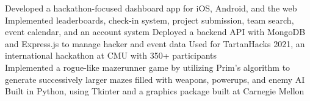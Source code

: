 \documentclass[]{paws}
\begin{document}
{    {Developed a hackathon-focused dashboard app for iOS, Android, and the web}
    {Implemented leaderboards, check-in system, project submission, team search, event calendar, and an account system}
    {Deployed a backend API with MongoDB and Express.js to manage hacker and event data}
    {Used for TartanHacks 2021, an international hackathon at CMU with 350+ participants}
    \, \\
    {Implemented a rogue-like mazerunner game by utilizing Prim's algorithm to generate successively larger mazes filled with weapons, powerups, and enemy AI}
    {Built in Python, using Tkinter and a graphics package built at Carnegie Mellon}

    \, \\ \\ \\

}
\end{document}
